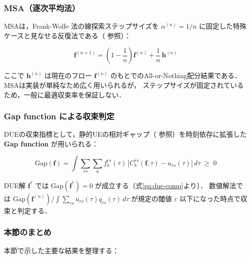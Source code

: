 \subsubsection*{MSA（逐次平均法）}

MSAは，Frank-Wolfe 法の線探索ステップサイズを
$\alpha^{(n)} = 1/n$ に固定した特殊ケースと見なせる反復法である（ 参照）：

\begin{equation}
  \boldsymbol{f}^{(n+1)}
  = \left(1 - \frac{1}{n}\right)\boldsymbol{f}^{(n)}
    + \frac{1}{n}\,\boldsymbol{h}^{(n)}
  \label{eq:msa-update}
\end{equation}

ここで $\boldsymbol{h}^{(n)}$ は現在のフロー $\boldsymbol{f}^{(n)}$ のもとでのAll-or-Nothing配分結果である．
MSAは実装が単純なため広く用いられるが，
ステップサイズが固定されているため，一般に最適収束率を保証しない．

\subsubsection*{Gap function による収束判定}

DUEの収束指標として，静的UEの相対ギャップ（ 参照）を時刻依存に拡張した
\textbf{Gap function} が用いられる：

\begin{equation}
  \mathrm{Gap}(\boldsymbol{f})
  = \int \sum_{rs} \sum_k
    f_k^{rs}(\tau)\,
    \bigl[C_k^{rs}(\boldsymbol{f}, \tau) - u_{rs}(\tau)\bigr]\,d\tau
  \;\geq\; 0
  \label{eq:gap-function}
\end{equation}

DUE解 $\boldsymbol{f}^*$ では $\mathrm{Gap}(\boldsymbol{f}^*) = 0$ が成立する（式\eqref{eq:due-comp}より）．
数値解法では $\mathrm{Gap}(\boldsymbol{f}^{(n)}) / \int \sum_{rs} u_{rs}(\tau) q_{rs}(\tau)\,d\tau$
が規定の閾値 $\varepsilon$ 以下になった時点で収束と判定する．

\subsubsection*{本節のまとめ}

本節で示した主要な結果を整理する：

